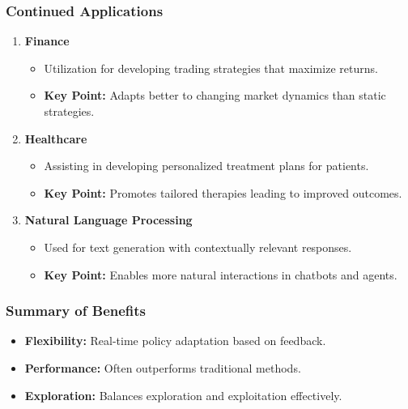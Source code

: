 \documentclass[aspectratio=169]{beamer}
\begin{document}
\begin{frame}[fragile]
    \frametitle{Continued Applications}
    \begin{enumerate}[resume]
        \item \textbf{Finance} 
            \begin{itemize}
                \item Utilization for developing trading strategies that maximize returns.
                \item \textbf{Key Point:} Adapts better to changing market dynamics than static strategies.
            \end{itemize}
        \item \textbf{Healthcare} 
            \begin{itemize}
                \item Assisting in developing personalized treatment plans for patients.
                \item \textbf{Key Point:} Promotes tailored therapies leading to improved outcomes.
            \end{itemize}
        \item \textbf{Natural Language Processing} 
            \begin{itemize}
                \item Used for text generation with contextually relevant responses.
                \item \textbf{Key Point:} Enables more natural interactions in chatbots and agents.
            \end{itemize}
    \end{enumerate}
\end{frame}

\begin{frame}[fragile]
    \frametitle{Summary of Benefits}
    \begin{itemize}
        \item \textbf{Flexibility:} Real-time policy adaptation based on feedback.
        \item \textbf{Performance:} Often outperforms traditional methods.
        \item \textbf{Exploration:} Balances exploration and exploitation effectively.
    \end{itemize}
\end{frame}
\end{document}
